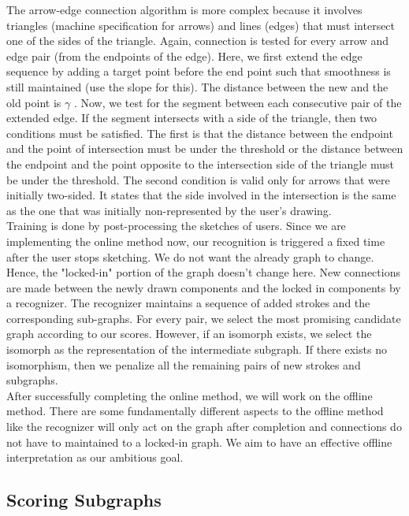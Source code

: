 The arrow-edge connection algorithm is more complex because it involves triangles (machine specification for arrows) and lines (edges) that must intersect one of the sides of the triangle. Again, connection is tested for every arrow and edge pair (from the endpoints of the edge). Here, we first extend the edge sequence by adding a target point before the end point such that smoothness is still maintained (use the slope for this). The distance between the new and the old point is $\gamma$ . Now, we test for the segment between each consecutive pair of the extended edge. If the segment intersects with a side of the triangle, then two conditions must be satisfied. The first is that the distance between the endpoint and the point of intersection must be under the threshold or the distance between the endpoint and the point opposite to the intersection side of the triangle must be under the threshold. The second condition is valid only for arrows that were initially two-sided. It states that the side involved in the intersection is the same as the one that was initially non-represented by the user's drawing.\\

Training is done by post-processing the sketches of users. Since we are implementing the online method now, our recognition is triggered a fixed time after the user stops sketching. We do not want the already graph to change. Hence, the "locked-in" portion of the graph doesn't change here. New connections are made between the newly drawn components and the locked in components by a recognizer. The recognizer maintains a sequence of added strokes and the corresponding sub-graphs. For every pair, we select the most promising candidate graph according to our scores. However, if an isomorph exists, we select the isomorph as the representation of the intermediate subgraph. If there exists no isomorphism, then we penalize all the remaining pairs of new strokes and subgraphs.\\

After successfully completing the online method, we will work on the offline method. There are some fundamentally different aspects to the offline method like the recognizer will only act on the graph after completion and connections do not have to maintained to a locked-in graph. We aim to have an effective offline interpretation as our ambitious goal.\\

\subsection{Scoring Subgraphs}

